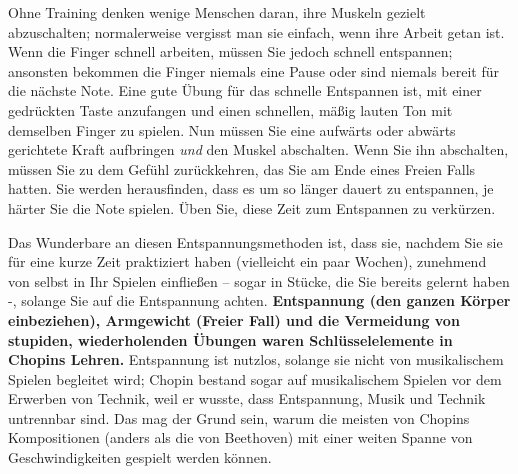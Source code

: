 Ohne Training denken wenige Menschen daran, ihre Muskeln gezielt abzuschalten; normalerweise vergisst man sie einfach, wenn ihre Arbeit getan ist.
Wenn die Finger schnell arbeiten, müssen Sie jedoch schnell entspannen; ansonsten bekommen die Finger niemals eine Pause oder sind niemals bereit für die nächste Note.
Eine gute Übung für das schnelle Entspannen ist, mit einer gedrückten Taste anzufangen und einen schnellen, mäßig lauten Ton mit demselben Finger zu spielen.
Nun müssen Sie eine aufwärts oder abwärts gerichtete Kraft aufbringen \textit{und} den Muskel abschalten.
Wenn Sie ihn abschalten, müssen Sie zu dem Gefühl zurückkehren, das Sie am Ende eines Freien Falls hatten.
Sie werden herausfinden, dass es um so länger dauert zu entspannen, je härter Sie die Note spielen.
Üben Sie, diese Zeit zum Entspannen zu verkürzen.

Das Wunderbare an diesen Entspannungsmethoden ist, dass sie, nachdem Sie sie für eine kurze Zeit praktiziert haben (vielleicht ein paar Wochen), zunehmend von selbst in Ihr Spielen einfließen -- sogar in Stücke, die Sie bereits gelernt haben -, solange Sie auf die Entspannung achten.
\textbf{Entspannung (den ganzen Körper einbeziehen), Armgewicht (Freier Fall) und die Vermeidung von stupiden, wiederholenden Übungen waren Schlüsselelemente in Chopins Lehren.}
Entspannung ist nutzlos, solange sie nicht von musikalischem Spielen begleitet wird; Chopin bestand sogar auf musikalischem Spielen vor dem Erwerben von Technik, weil er wusste, dass Entspannung, Musik und Technik untrennbar sind.
Das mag der Grund sein, warum die meisten von Chopins Kompositionen (anders als die von Beethoven) mit einer weiten Spanne von Geschwindigkeiten gespielt werden können.




